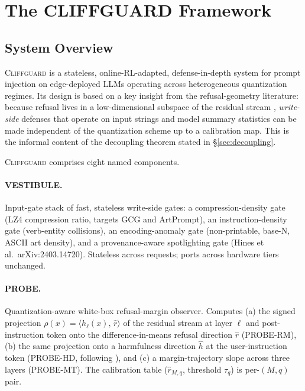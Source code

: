 \documentclass[11pt,a4paper]{article}
\newcommand{\rhat}{\hat{r}}
\newcommand{\tauq}{\tau_q}
\newcommand{\CG}{\textsc{Cliffguard}}
\begin{document}
\section{The CLIFFGUARD Framework}
\label{sec:framework}

\subsection{System Overview}

\CG{} is a stateless, online-RL-adapted, defense-in-depth system for prompt
injection on edge-deployed LLMs operating across heterogeneous quantization
regimes.
Its design is based on a key insight from the refusal-geometry literature:
because refusal lives in a low-dimensional subspace of the residual stream
\citep{arditi2024refusal}, \emph{write-side} defenses that operate on input
strings and model summary statistics can be made independent of the quantization
scheme up to a calibration map.
This is the informal content of the decoupling theorem stated in
\S\ref{sec:decoupling}.

\CG{} comprises eight named components.

\paragraph{VESTIBULE.}
Input-gate stack of fast, stateless write-side gates: a compression-density gate
(LZ4 compression ratio, targets GCG and ArtPrompt), an instruction-density gate
(verb-entity collisions), an encoding-anomaly gate (non-printable, base-N,
ASCII art density), and a provenance-aware spotlighting gate (Hines et al.\
arXiv:2403.14720). Stateless across requests; ports across hardware tiers unchanged.

\paragraph{PROBE.}
Quantization-aware white-box refusal-margin observer.
Computes (a) the signed projection $\rho(x) = \langle h_\ell(x),\, \rhat \rangle$
of the residual stream at layer $\ell$ and post-instruction token onto the
difference-in-means refusal direction $\rhat$ (PROBE-RM), (b) the same
projection onto a harmfulness direction $\hat{h}$ at the user-instruction token
(PROBE-HD, following \citealt{zhao2025refusal}), and (c) a margin-trajectory
slope across three layers (PROBE-MT).
The calibration table ($\rhat_{M,q}$, threshold $\tauq$) is per-$(M, q)$ pair.
\end{document}
